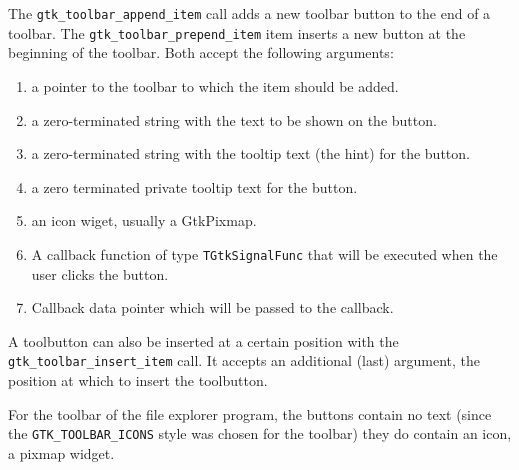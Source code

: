 \documentclass[10pt]{article}
\begin{document}
The \lstinline|gtk_toolbar_append_item| call adds a new toolbar button 
to the end of a toolbar. The \lstinline|gtk_toolbar_prepend_item| item 
inserts a new button at the beginning of the toolbar. Both accept the 
following arguments:
\begin{enumerate}
\item a pointer to the toolbar to which the item should be added.
\item a zero-terminated string with the text to be shown on the button.
\item a zero-terminated string with the tooltip text (the hint) for the button.
\item a zero terminated private tooltip text for the button.
\item an icon wiget, usually a GtkPixmap.
\item A callback function of type \lstinline|TGtkSignalFunc| that will be 
executed when the user clicks the button.
\item Callback data pointer which will be passed to the callback.
\end{enumerate}
A toolbutton can also be inserted at a certain position with the
\lstinline|gtk_toolbar_insert_item| call. It accepts an additional (last) 
argument, the position at which to insert the toolbutton. 

For the toolbar of the file explorer program, the buttons contain no text
(since the \lstinline|GTK_TOOLBAR_ICONS| style was chosen for the toolbar)
they do contain an icon, a pixmap widget.
\end{document}
